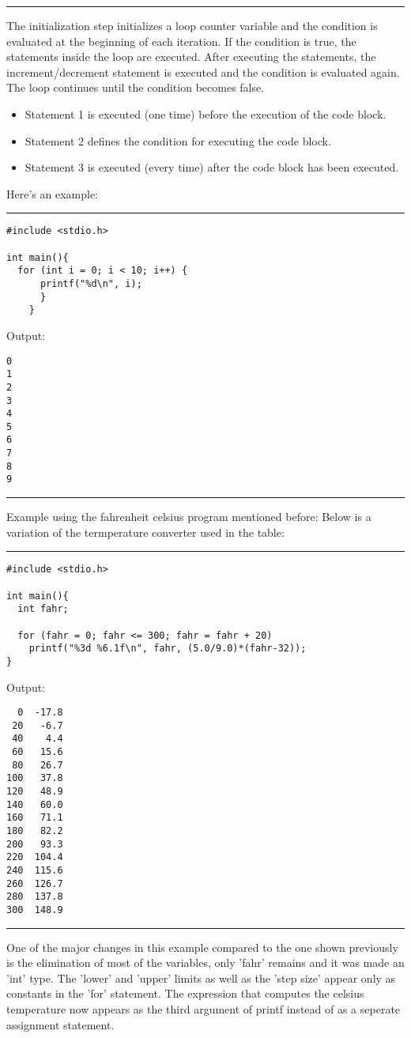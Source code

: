 \documentclass[a4paper]{article}
\begin{document}
\noindent\rule{\textwidth}{0.5pt}
The initialization step initializes a loop counter variable and the condition is
evaluated at the beginning of each iteration. If the condition is true, the
statements inside the loop are executed. After executing the statements, the
increment/decrement statement is executed and the condition is evaluated
again. The loop continues until the condition becomes false.

\begin{itemize}
\item Statement 1 is executed (one time) before the execution of the code block.
\item Statement 2 defines the condition for executing the code block.
\item Statement 3 is executed (every time) after the code block has been executed.
\end{itemize}

Here's an example:

\noindent\rule{\textwidth}{0.5pt}
\begin{verbatim}
#include <stdio.h>

int main(){
  for (int i = 0; i < 10; i++) {
      printf("%d\n", i);
      }
    }
\end{verbatim}
Output:
\begin{verbatim}
0
1
2
3
4
5
6
7
8
9
\end{verbatim}

\noindent\rule{\textwidth}{0.5pt}

Example using the fahrenheit celsius program mentioned before:
Below is a variation of the termperature converter used in the table:

\noindent\rule{\textwidth}{0.5pt}
\begin{verbatim}
#include <stdio.h>

int main(){
  int fahr;

  for (fahr = 0; fahr <= 300; fahr = fahr + 20)
    printf("%3d %6.1f\n", fahr, (5.0/9.0)*(fahr-32));
}
\end{verbatim}
Output:
\begin{verbatim}
  0  -17.8
 20   -6.7
 40    4.4
 60   15.6
 80   26.7
100   37.8
120   48.9
140   60.0
160   71.1
180   82.2
200   93.3
220  104.4
240  115.6
260  126.7
280  137.8
300  148.9
\end{verbatim}

\noindent\rule{\textwidth}{0.5pt}
One of the major changes in this example compared to the one shown previously is
the elimination of most of the variables, only 'fahr' remains and it was made an
'int' type.
The 'lower' and 'upper' limits as well as the 'step size' appear only as
constants in the 'for' statement. The expression that computes the celsius
temperature now appears as the third argument of printf instead of as a seperate
assignment statement.
\end{document}
